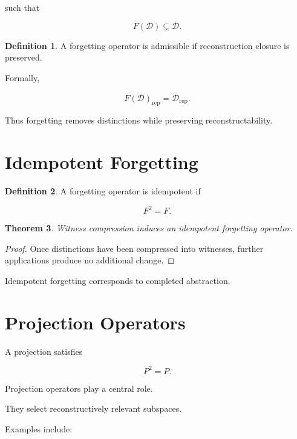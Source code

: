 \documentclass[12pt,oneside]{book}
\theoremstyle{plain} \newtheorem{theorem}{Theorem}[chapter] \newtheorem{lemma}[theorem]{Lemma} \newtheorem{proposition}[theorem]{Proposition} \newtheorem{corollary}[theorem]{Corollary}
\theoremstyle{definition} \newtheorem{definition}[theorem]{Definition} \newtheorem{axiom}[theorem]{Axiom} \newtheorem{construction}[theorem]{Construction}
\theoremstyle{remark} \newtheorem{remark}[theorem]{Remark} \newtheorem{example}[theorem]{Example}
\begin{document}
such that

\[
F(\mathcal D)
\subsetneq
\mathcal D.
\]

\begin{definition}

A forgetting operator is admissible if reconstruction closure is preserved.

\end{definition}

Formally,

\[
\overline{F(\mathcal D)}_{\mathrm{rep}}
=
\overline{\mathcal D}_{\mathrm{rep}}.
\]

Thus forgetting removes distinctions while preserving reconstructability.

\section{Idempotent Forgetting}

\begin{definition}

A forgetting operator is idempotent if

\[
F^2
=
F.
\]

\end{definition}

\begin{theorem}

Witness compression induces an idempotent forgetting operator.

\end{theorem}

\begin{proof}

Once distinctions have been compressed into witnesses, further applications produce no additional change.

\end{proof}

Idempotent forgetting corresponds to completed abstraction.

\section{Projection Operators}

A projection satisfies

\[
P^2=P.
\]

Projection operators play a central role.

They select reconstructively relevant subspaces.

Examples include:
\end{document}
